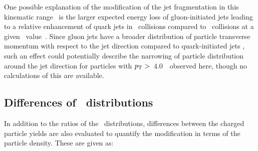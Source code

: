 One possible explanation of the modification of the 
jet fragmentation in this kinematic range~\cite{PhysRevC.98.024908} is the larger expected energy loss
of gluon-initiated jets leading to a relative enhancement of quark jets in \pbpb\ collisions compared
to \pp\ collisions at a given \ptjet\ value~\cite{Spousta:2015fca}.
Since gluon jets have a broader distribution of particle transverse momentum with respect to the jet direction compared to quark-initiated jets \cite{OPAL:1995ab}
 , such an effect could potentially describe the narrowing of particle distribution around the jet direction for particles with $\mbox{$p_{\mathrm{T}}$} >$~4.0~\GeV\
observed here, though no calculations of this are available.



\FloatBarrier


\subsection{Differences of \Dptr\ distributions}
In addition to the ratios of the \Dptr\ distributions, differences between the charged particle yields are also evaluated to quantify the modification in terms of the particle density.
These are given as:

